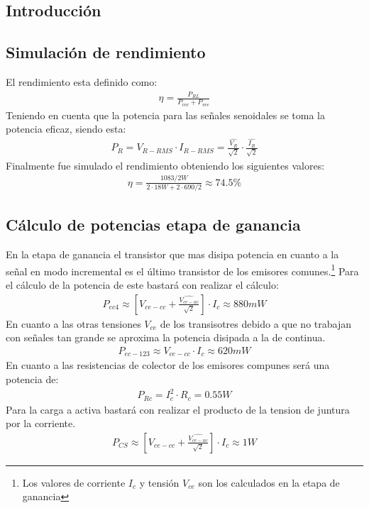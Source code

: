 %
%
%
\subsection{Introducción}

\subsection{Simulación de  rendimiento}
El rendimiento esta definido como:
\begin{align}
\eta = \frac{P_{RL}}{P_{vcc}+P_{vee}}
\end{align}
Teniendo en cuenta que la potencia para las señales senoidales se toma la potencia eficaz, siendo esta:
\begin{align}
P_{R}=V_{R-RMS}\cdot I_{R-RMS} =\frac{\hat{V_{R}}}{\sqrt{2}} \cdot \frac{\hat{I_{R}}}{\sqrt{2}}
\end{align}
Finalmente fue simulado el rendimiento obteniendo los siguientes valores:
\begin{align}
\eta=\frac{1083 / 2 W}{ 2\cdot 18 W + 2 \cdot 690 /2}\approx 74.5 \%
\end{align}
\subsection{Cálculo de potencias etapa de ganancia}
En la etapa de ganancia el transistor que mas disipa potencia en cuanto a la señal en modo incremental es el último transistor de los emisores comunes.\footnote{Los valores de corriente $I_c$ y tensión $V_{ce}$ son los calculados en la etapa de ganancia}
Para el cálculo de la potencia de este bastará con realizar el cálculo:
\begin{align}
P_{ec4}\approx\left[V_{ce-cc} + \frac{\hat{V_{ce-ac}}}{\sqrt{2}}\right]\cdot I_c\approx 880mW
\end{align}
En cuanto a las otras tensiones $V_{ce}$ de los transisotres debido a que no trabajan con señales tan grande se aproxima la potencia disipada a la de continua.
\begin{align}
P_{ec-123}\approx V_{ce-cc} \cdot I_c \approx 620mW
\end{align}
En cuanto a las resistencias de colector de los emisores compunes será una potencia de:
\begin{align}
P_{Rc}= I_c^2 \cdot R_c= 0.55 W
\end{align}
 Para la carga a activa bastará con realizar el producto de la tension de juntura por la corriente.
\begin{align}
P_{CS}\approx\left[V_{ce-cc} + \frac{\hat{V_{ce-ac}}}{\sqrt{2}}\right]\cdot I_c\approx 1W
\end{align}
%
%
